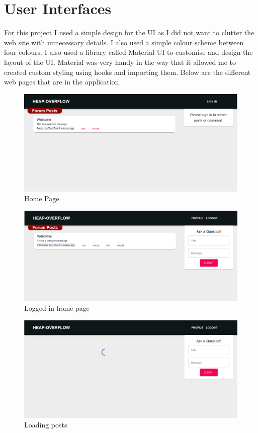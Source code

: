 \section{User Interfaces}
For this project I used a simple design for the UI as I did not want to clutter the web site with unnecessary details. I also used a simple colour scheme between four colours. I also used a library called Material-UI to customise and design the layout of the UI. Material was very handy in the way that it allowed me to created custom styling using hooks and importing them. Below are the different web pages that are in the application.

\newpage
\begin{figure}
    \centering
    \includegraphics[scale=0.4]{img/UI/logged-out.png}
    \caption{Home Page}
    \label{fig8.1:home}
\end{figure}
\begin{figure}
    \centering
    \includegraphics[scale=0.4]{img/UI/welcome.png}
    \caption{Logged in home page}
    \label{fig8.2:welcome}
\end{figure}
\begin{figure}
    \centering
    \includegraphics[scale=0.4]{img/UI/no-posts.png}
    \caption{Loading posts}
    \label{fig8.3:loadposts}
\end{figure}
